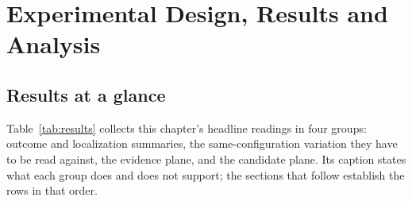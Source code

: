 \chapter{Experimental Design, Results and Analysis}
\label{ch:results}
\label{ch:design}



\section*{Results at a glance}

Table~\ref{tab:results} collects this chapter's headline readings in four
groups: outcome and localization summaries, the same-configuration variation they have to
be read against, the evidence plane, and the candidate plane. Its caption
states what each group does and does not support; the sections that follow
establish the rows in that order.

